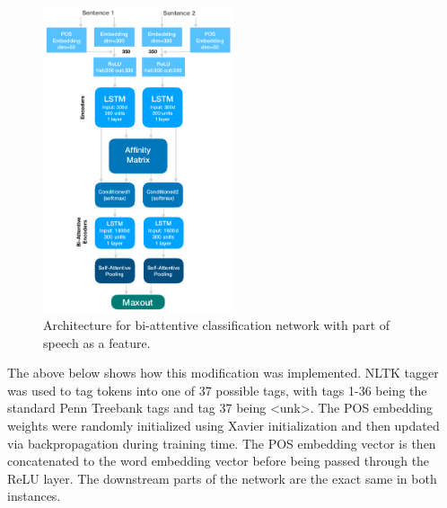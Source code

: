 \begin{figure}[H]
	\includegraphics[width=0.5\textwidth]{images/arch_modified.png}
	\caption{Architecture for bi-attentive classification network with part of speech as a feature.}
\end{figure}

The above below shows how this modification was implemented. NLTK tagger was used to tag tokens into one of 37 possible tags, with tags 1-36 being the standard Penn Treebank tags and tag 37 being <unk>. The POS embedding weights were randomly initialized using Xavier initialization \cite{glorot_bengio} and then updated via backpropagation during training time. The POS embedding vector is then concatenated to the word embedding vector before being passed through the ReLU layer. The downstream parts of the network are the exact same in both instances.

